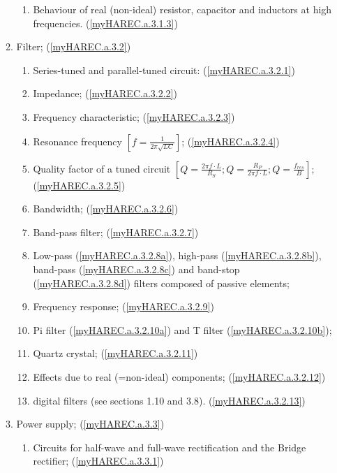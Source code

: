 \begin{enumerate}
\begin{enumerate}[noitemsep]
\begin{enumerate}[noitemsep]
\item Behaviour of real (non-ideal) resistor, capacitor and inductors at high frequencies. (\ref{myHAREC.a.3.1.3})\label{HAREC.a.3.1.3}
\end{enumerate}
\item Filter; (\ref{myHAREC.a.3.2})\label{HAREC.a.3.2}
\begin{enumerate}[noitemsep]
\item Series-tuned and parallel-tuned circuit: (\ref{myHAREC.a.3.2.1})\label{HAREC.a.3.2.1}
\item Impedance; (\ref{myHAREC.a.3.2.2})\label{HAREC.a.3.2.2}
\item Frequency characteristic;  (\ref{myHAREC.a.3.2.3})\label{HAREC.a.3.2.3}
\item Resonance frequency \(\left[f=\frac{1}{2\pi\sqrt{LC}}\right]\); (\ref{myHAREC.a.3.2.4})\label{HAREC.a.3.2.4}
\item Quality factor of a tuned circuit \(\left[Q=\frac{2\pi f \cdot L}{R_S}; Q=\frac{R_P}{2\pi f \cdot L};Q=\frac{f_{res}}{B}\right]\); (\ref{myHAREC.a.3.2.5})\label{HAREC.a.3.2.5}
\item Bandwidth; (\ref{myHAREC.a.3.2.6})\label{HAREC.a.3.2.6}
\item Band-pass filter; (\ref{myHAREC.a.3.2.7})\label{HAREC.a.3.2.7}
\item Low-pass (\ref{myHAREC.a.3.2.8a})\label{HAREC.a.3.2.8a}, high-pass (\ref{myHAREC.a.3.2.8b})\label{HAREC.a.3.2.8b}, band-pass (\ref{myHAREC.a.3.2.8c})\label{HAREC.a.3.2.8c} and band-stop (\ref{myHAREC.a.3.2.8d})\label{HAREC.a.3.2.8d} filters composed of passive elements;
\item Frequency response; (\ref{myHAREC.a.3.2.9})\label{HAREC.a.3.2.9}
\item Pi filter (\ref{myHAREC.a.3.2.10a})\label{HAREC.a.3.2.10a} and T filter (\ref{myHAREC.a.3.2.10b})\label{HAREC.a.3.2.10b};
\item Quartz crystal; (\ref{myHAREC.a.3.2.11})\label{HAREC.a.3.2.11}
\item Effects due to real (=non-ideal) components; (\ref{myHAREC.a.3.2.12})\label{HAREC.a.3.2.12}
\item digital filters (see sections 1.10 and 3.8). (\ref{myHAREC.a.3.2.13})\label{HAREC.a.3.2.13}
\end{enumerate}
\item Power supply; (\ref{myHAREC.a.3.3})\label{HAREC.a.3.3}
\begin{enumerate}[noitemsep]
\item Circuits for half-wave and full-wave rectification and the Bridge rectifier; (\ref{myHAREC.a.3.3.1})\label{HAREC.a.3.3.1}

\end{enumerate}
\end{enumerate}
\end{enumerate}
